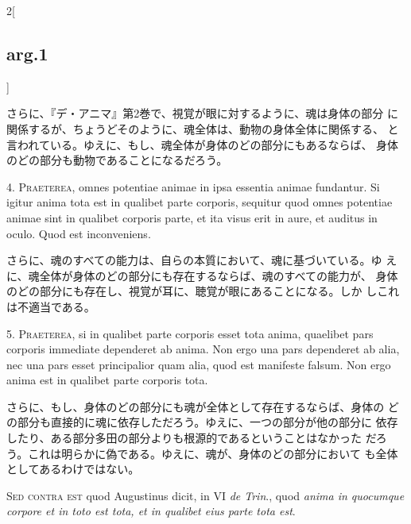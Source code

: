 \documentclass[paper=a4paper,fontsize=10pt,jafontsize=9pt,titlepage]{jlreq}
\begin{document}
\begin{paracol}{2}[\subsection{arg.1}]
 \switchcolumn

 さらに、『デ・アニマ』第2巻で、視覚が眼に対するように、魂は身体の部分
 に関係するが、ちょうどそのように、魂全体は、動物の身体全体に関係する、
 と言われている。ゆえに、もし、魂全体が身体のどの部分にもあるならば、
 身体のどの部分も動物であることになるだろう。




4. {\scshape Praeterea}, omnes potentiae animae in ipsa essentia
animae fundantur. Si igitur anima tota est in qualibet parte corporis,
sequitur quod omnes potentiae animae sint in qualibet corporis parte,
et ita visus erit in aure, et auditus in oculo. Quod est inconveniens.

 \switchcolumn

 さらに、魂のすべての能力は、自らの本質において、魂に基づいている。ゆ
 えに、魂全体が身体のどの部分にも存在するならば、魂のすべての能力が、
 身体のどの部分にも存在し、視覚が耳に、聴覚が眼にあることになる。しか
 しこれは不適当である。
 



5. {\scshape Praeterea}, si in qualibet parte corporis esset tota
anima, quaelibet pars corporis immediate dependeret ab anima. Non ergo
una pars dependeret ab alia, nec una pars esset principalior quam
alia, quod est manifeste falsum. Non ergo anima est in qualibet parte
corporis tota.

 \switchcolumn

 さらに、もし、身体のどの部分にも魂が全体として存在するならば、身体の
 どの部分も直接的に魂に依存しただろう。ゆえに、一つの部分が他の部分に
 依存したり、ある部分多田の部分よりも根源的であるということはなかった
 だろう。これは明らかに偽である。ゆえに、魂が、身体のどの部分において
 も全体としてあるわけではない。
 
\switchcolumn*[\subsection{s.c.}]



 {\scshape Sed contra est} quod Augustinus dicit, in VI {\itshape de
 Trin}., quod {\itshape anima in quocumque corpore et in toto est tota, et in
 qualibet eius parte tota est}.


\end{paracol}
\end{document}
